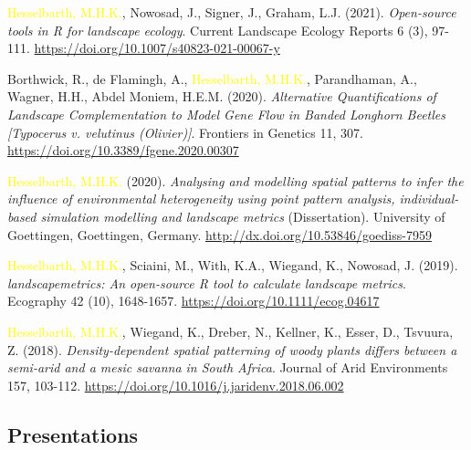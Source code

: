 \documentclass[hidelinks]{report}
\begin{document}
\begin{hangparas}{7.5mm}{1}
\textcolor{yellow}{Hesselbarth, M.H.K.}, Nowosad, J., Signer, J., Graham, L.J. (2021). \textit{Open-source tools in R for landscape ecology}. Current Landscape Ecology Reports 6 (3), 97-111. \url{https://doi.org/10.1007/s40823-021-00067-y}

Borthwick, R.\textcolor{grey}{\Cross}, de Flamingh, A.\textcolor{grey}{\Cross}, \textcolor{yellow}{Hesselbarth, M.H.K.}\textcolor{grey}{\Cross}, Parandhaman, A.\textcolor{grey}{\Cross}, Wagner, H.H., Abdel Moniem, H.E.M. (2020). \textit{Alternative Quantifications of Landscape Complementation to Model Gene Flow in Banded Longhorn Beetles [Typocerus v. velutinus (Olivier)]}. Frontiers in Genetics 11, 307. \url{https://doi.org/10.3389/fgene.2020.00307}

\textcolor{yellow}{Hesselbarth, M.H.K.} (2020). \textit{Analysing and modelling spatial patterns to infer the influence of environmental heterogeneity using point pattern analysis, individual-based simulation modelling and landscape metrics} (Dissertation). University of Goettingen, Goettingen, Germany. \url{http://dx.doi.org/10.53846/goediss-7959}

\textcolor{yellow}{Hesselbarth, M.H.K.}, Sciaini, M., With, K.A., Wiegand, K., Nowosad, J. (2019). \textit{landscapemetrics: An open-source R tool to calculate landscape metrics}. Ecography 42 (10), 1648-1657. \url{https://doi.org/10.1111/ecog.04617}

\textcolor{yellow}{Hesselbarth, M.H.K.}, Wiegand, K., Dreber, N., Kellner, K., Esser, D., Tsvuura, Z. (2018). \textit{Density-dependent spatial patterning of woody plants differs between a semi-arid and a mesic savanna in South Africa}. Journal of Arid Environments 157, 103-112. \url{https://doi.org/10.1016/j.jaridenv.2018.06.002}

\end{hangparas}

\subsection*{Presentations}
\end{document}
